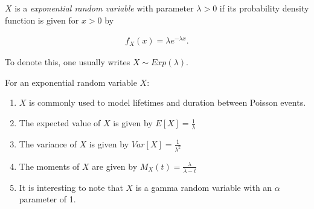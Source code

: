 \documentclass{article}
\begin{document}
$X$ is a \emph{exponential random variable} with parameter $\lambda>0$ if its probability density function is given for $x>0$ by

\begin{align*}
f_X(x) = \lambda e^{-\lambda x}.
\end{align*}

To denote this, one usually writes $X\sim Exp(\lambda)$.


For an exponential random variable $X$:
\begin{enumerate}
\item $X$ is commonly used to model lifetimes and duration between Poisson events.
\item The expected value of $X$ is given by $E[X] = \frac{1}{\lambda}$
\item The variance of $X$ is given by $Var[X] = \frac{1}{\lambda^2}$
\item The moments of $X$ are given by $M_X(t) = \frac{\lambda}{\lambda - t}$
\item It is interesting to note that $X$ is a gamma random variable with an $\alpha$ parameter of 1.

\end{enumerate}
\end{document}
